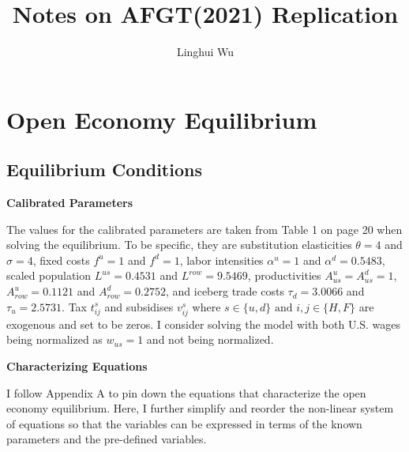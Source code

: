 \documentclass{homeworg}
\title{Notes on AFGT(2021) Replication}
\author{Linghui Wu}
\begin{document}
\maketitle

\section{Open Economy Equilibrium}

\subsection{Equilibrium Conditions}


\textbf{Calibrated Parameters}

The values for the calibrated parameters are taken from Table 1 on page 20 when solving the equilibrium. To be specific, they are substitution elasticities $\theta = 4$ and $\sigma = 4$, fixed costs $f^{u} = 1$ and $f^{d} = 1$,  labor intensities $\alpha^{u} = 1$ and $\alpha^{d} = 0.5483$, scaled population $L^{us} = 0.4531$ and $L^{row} = 9.5469$, productivities $A^{u}_{us} = A^{d}_{us} = 1$, $A^{u}_{row} = 0.1121$ and $A^{d}_{row} = 0.2752$, and iceberg trade costs $\tau_d = 3.0066$ and $\tau_u = 2.5731$. Tax $t^{s}_{ij}$ and subsidises $v^{s}_{ij}$ where $s \in \{u, d\} \text{ and } i, j \in \{H, F\}$ are exogenous and set to be zeros. I consider solving the model with both U.S. wages being normalized as $w_{us} = 1$ and not being normalized.

\textbf{Characterizing Equations}

I follow Appendix A to pin down the equations that characterize the open economy equilibrium. Here, I further simplify and reorder the non-linear system of equations so that the variables can be expressed in terms of the known parameters and the pre-defined variables.
\end{document}
